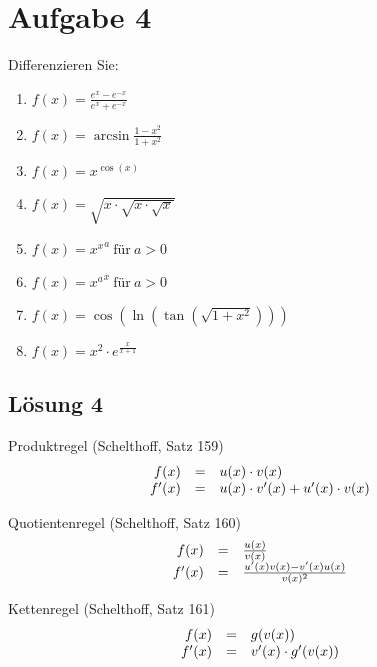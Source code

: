 \documentclass[main.tex]{subfiles}
\begin{document}
\section{Aufgabe 4}
Differenzieren Sie:

\begin{enumerate}
    \item $f( x) =\frac{e^{x} -e^{-x}}{e^{x} +e^{-x}}$
    \item $f( x) =\arcsin\frac{1-x^{2}}{1+x^{2}}$
    \item $f( x) =x^{\cos( x)}$
    \item $f( x) =\sqrt{x\cdotp \sqrt{x\cdotp \sqrt{x}}}$
    \item $f( x) =x{^{x}}^{a} \ \text{für} \ a >0$
    \item $f( x) =x{^{a}}^{x} \ \text{für} \ a >0$
    \item $f( x) =\cos\left(\ln\left(\tan\left(\sqrt{1+x^{2}}\right)\right)\right)$
    \item $f( x) =x^{2} \cdotp e^{\frac{x}{x+1}}$
\end{enumerate}

\subsection{Lösung 4}
Produktregel (Schelthoff\footnotemark{}, Satz 159)
\begin{equation*}
    \begin{array}{ r c l }
    f( x) & = & u( x) \cdotp v( x)\\
    f'( x) & = & u( x) \cdotp v'( x) +u'( x) \cdotp v( x)
    \end{array}
\end{equation*}

Quotientenregel (Schelthoff\footnotemark[\value{footnote}], Satz 160)
\begin{equation*}
    \begin{array}{ r c l }
    f( x) & = & \frac{u( x)}{v( x)}\\
    f'( x) & = & \frac{u'( x) v( x) -v'( x) u( x)}{v( x)^{2}}
    \end{array}
\end{equation*}

Kettenregel (Schelthoff\footnotemark[\value{footnote}], Satz 161)
\begin{equation*}
    \begin{array}{ r c l }
    f( x) & = & g( v( x))\\
    f'( x) & = & v'( x) \cdotp g'( v( x))
    \end{array}
\end{equation*}
\end{document}
